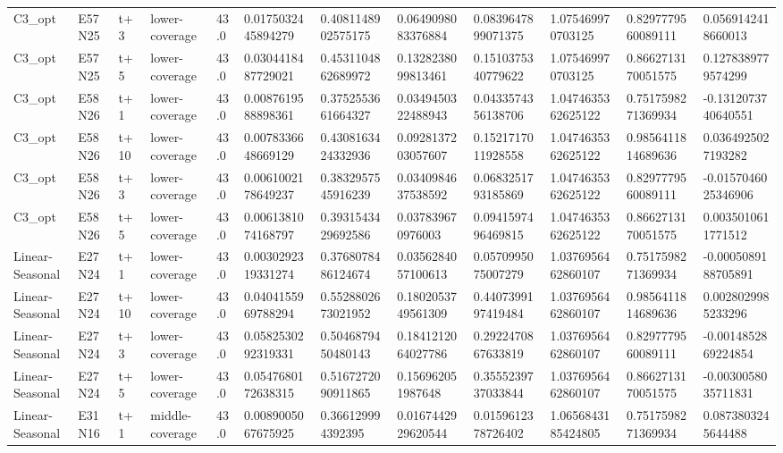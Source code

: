\begin{landscape}
\begin{longtable}{llllllllllll}
C3\_opt & E57N25 & t+3 & lower-coverage & 43.0 & 0.0175032445894279 & 0.4081148902575175 & 0.0649098083376884 & 0.0839647899071375 & 1.075469970703125 & 0.8297779560089111 & 0.0569142418660013 \\
C3\_opt & E57N25 & t+5 & lower-coverage & 43.0 & 0.0304418487729021 & 0.4531104862689972 & 0.1328238099813461 & 0.1510375340779622 & 1.075469970703125 & 0.8662713170051575 & 0.1278389779574299 \\
C3\_opt & E58N26 & t+1 & lower-coverage & 43.0 & 0.0087619588898361 & 0.3752553661664327 & 0.0349450322488943 & 0.0433574356138706 & 1.0474635362625122 & 0.7517598271369934 & -0.1312073740640551 \\
C3\_opt & E58N26 & t+10 & lower-coverage & 43.0 & 0.0078336648669129 & 0.4308163424332936 & 0.0928137203057607 & 0.1521717011928558 & 1.0474635362625122 & 0.9856411814689636 & 0.0364925027193282 \\
C3\_opt & E58N26 & t+3 & lower-coverage & 43.0 & 0.0061002178649237 & 0.3832957545916239 & 0.0340984637538592 & 0.0683251793185869 & 1.0474635362625122 & 0.8297779560089111 & -0.0157046025346906 \\
C3\_opt & E58N26 & t+5 & lower-coverage & 43.0 & 0.0061381074168797 & 0.3931543429692586 & 0.037839670976003 & 0.0941597496469815 & 1.0474635362625122 & 0.8662713170051575 & 0.0035010611771512 \\
Linear-Seasonal & E27N24 & t+1 & lower-coverage & 43.0 & 0.0030292319331274 & 0.3768078486124674 & 0.0356284057100613 & 0.0570995075007279 & 1.0376956462860107 & 0.7517598271369934 & -0.0005089188705891 \\
Linear-Seasonal & E27N24 & t+10 & lower-coverage & 43.0 & 0.0404155969788294 & 0.5528802673021952 & 0.1802053749561309 & 0.4407399197419484 & 1.0376956462860107 & 0.9856411814689636 & 0.0028029985233296 \\
Linear-Seasonal & E27N24 & t+3 & lower-coverage & 43.0 & 0.0582530292319331 & 0.5046879450480143 & 0.1841212064027786 & 0.2922470867633819 & 1.0376956462860107 & 0.8297779560089111 & -0.0014852869224854 \\
Linear-Seasonal & E27N24 & t+5 & lower-coverage & 43.0 & 0.0547680172638315 & 0.5167272090911865 & 0.156962051987648 & 0.3555239737033844 & 1.0376956462860107 & 0.8662713170051575 & -0.0030058035711831 \\
Linear-Seasonal & E31N16 & t+1 & middle-coverage & 43.0 & 0.0089005067675925 & 0.366129994392395 & 0.0167442929620544 & 0.0159612378726402 & 1.0656843185424805 & 0.7517598271369934 & 0.0873803245644488 \\

\end{longtable}
\end{landscape}
